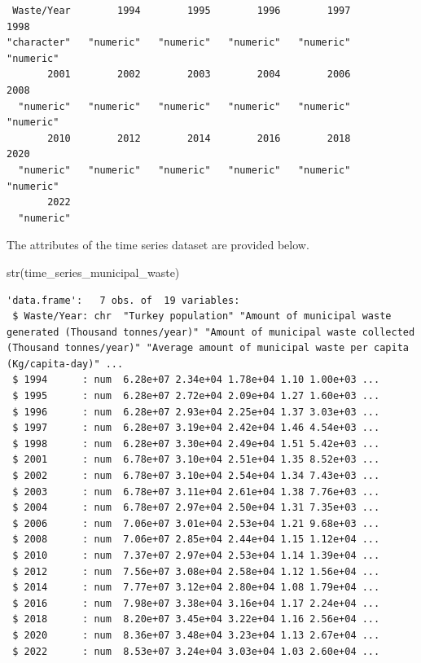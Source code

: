 \documentclass[
  11pt,
  a4paper,
  DIV=11,
  numbers=noendperiod]{scrartcl}
\newenvironment{Shaded}{\begin{snugshade}}{\end{snugshade}}
\newcommand{\FunctionTok}[1]{\textcolor[rgb]{0.28,0.35,0.67}{#1}}
\newcommand{\NormalTok}[1]{\textcolor[rgb]{0.00,0.23,0.31}{#1}}
\begin{document}
\begin{verbatim}
 Waste/Year        1994        1995        1996        1997        1998 
"character"   "numeric"   "numeric"   "numeric"   "numeric"   "numeric" 
       2001        2002        2003        2004        2006        2008 
  "numeric"   "numeric"   "numeric"   "numeric"   "numeric"   "numeric" 
       2010        2012        2014        2016        2018        2020 
  "numeric"   "numeric"   "numeric"   "numeric"   "numeric"   "numeric" 
       2022 
  "numeric" 
\end{verbatim}

The attributes of the time series dataset are provided below.

\begin{Shaded}
\begin{Highlighting}[]
\FunctionTok{str}\NormalTok{(time\_series\_municipal\_waste)}
\end{Highlighting}
\end{Shaded}

\begin{verbatim}
'data.frame':   7 obs. of  19 variables:
 $ Waste/Year: chr  "Turkey population" "Amount of municipal waste generated (Thousand tonnes/year)" "Amount of municipal waste collected (Thousand tonnes/year)" "Average amount of municipal waste per capita (Kg/capita-day)" ...
 $ 1994      : num  6.28e+07 2.34e+04 1.78e+04 1.10 1.00e+03 ...
 $ 1995      : num  6.28e+07 2.72e+04 2.09e+04 1.27 1.60e+03 ...
 $ 1996      : num  6.28e+07 2.93e+04 2.25e+04 1.37 3.03e+03 ...
 $ 1997      : num  6.28e+07 3.19e+04 2.42e+04 1.46 4.54e+03 ...
 $ 1998      : num  6.28e+07 3.30e+04 2.49e+04 1.51 5.42e+03 ...
 $ 2001      : num  6.78e+07 3.10e+04 2.51e+04 1.35 8.52e+03 ...
 $ 2002      : num  6.78e+07 3.10e+04 2.54e+04 1.34 7.43e+03 ...
 $ 2003      : num  6.78e+07 3.11e+04 2.61e+04 1.38 7.76e+03 ...
 $ 2004      : num  6.78e+07 2.97e+04 2.50e+04 1.31 7.35e+03 ...
 $ 2006      : num  7.06e+07 3.01e+04 2.53e+04 1.21 9.68e+03 ...
 $ 2008      : num  7.06e+07 2.85e+04 2.44e+04 1.15 1.12e+04 ...
 $ 2010      : num  7.37e+07 2.97e+04 2.53e+04 1.14 1.39e+04 ...
 $ 2012      : num  7.56e+07 3.08e+04 2.58e+04 1.12 1.56e+04 ...
 $ 2014      : num  7.77e+07 3.12e+04 2.80e+04 1.08 1.79e+04 ...
 $ 2016      : num  7.98e+07 3.38e+04 3.16e+04 1.17 2.24e+04 ...
 $ 2018      : num  8.20e+07 3.45e+04 3.22e+04 1.16 2.56e+04 ...
 $ 2020      : num  8.36e+07 3.48e+04 3.23e+04 1.13 2.67e+04 ...
 $ 2022      : num  8.53e+07 3.24e+04 3.03e+04 1.03 2.60e+04 ...
\end{verbatim}
\end{document}
